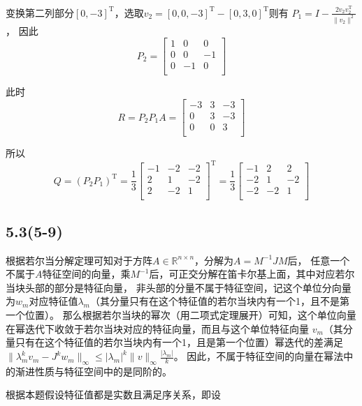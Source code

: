 \documentclass[UTF8,zihao=5]{ctexart}
\newcommand{\trans}[0]{^\mathrm{T}}
\begin{document}
变换第二列部分$[0,-3]\trans$，选取$v_2=[0,0,-3]\trans-[0,3,0]\trans$则有
$P_1=I-\frac{2v_2v_2\trans}{\|v_2\|^2}$，
因此
$$
    P_2=\begin{bmatrix}
        1 & 0  & 0  \\
        0 & 0  & -1 \\
        0 & -1 & 0  \\
    \end{bmatrix}
$$

此时
$$
    R=P_2P_1A=\begin{bmatrix}
        -3 & 3 & -3 \\
        0  & 3 & -3 \\
        0  & 0 & 3  \\
    \end{bmatrix}
$$

所以
$$
    Q=(P_2P_1)\trans=\frac{1}{3}\begin{bmatrix}
        -1 & -2 & -2 \\
        2  & 1  & -2 \\
        2  & -2 & 1  \\
    \end{bmatrix}\trans=\frac{1}{3}\begin{bmatrix}
        -1 & 2  & 2  \\
        -2 & 1  & -2 \\
        -2 & -2 & 1  \\
    \end{bmatrix}
$$

\subsection*{5.3(5-9)}

根据若尔当分解定理可知对于方阵$A\in\mathbb{R}^{n\times n}$，分解为$A=M^{-1}JM$后，
任意一个不属于$A$特征空间的向量，乘$M^{-1}$后，可正交分解在笛卡尔基上面，其中对应若尔当块头部的部分是特征向量，
非头部的分量不属于特征空间，记这个单位分向量为$w_{m}$对应特征值$\lambda_m$（其分量只有在这个特征值的若尔当块内有一个1，且不是第一个位置）。
那么根据若尔当块的幂次（用二项式定理展开）可知，这个单位向量在幂迭代下收敛于若尔当块对应的特征向量，而且与这个单位特征向量
$v_m$（其分量只有在这个特征值的若尔当块内有一个1，且是第一个位置）幂迭代的差满足$\|\lambda_m^kv_m-J^kw_{m}\|_\infty \leq |\lambda_m|^k\|v\|_\infty \frac{|\lambda_m|}{k}$。
因此，不属于特征空间的向量在幂法中的渐进性质与特征空间中的是同阶的。

根据本题假设特征值都是实数且满足序关系，即设
\end{document}

